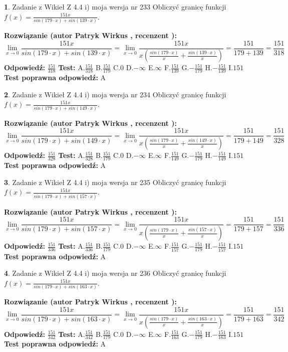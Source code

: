\documentclass[12pt, a4paper]{article}
\theoremstyle{definition} %
\newtheorem{zad}{}
\newcommand{\zadStart}[1]{\begin{zad}#1\newline}
\newcommand{\zadStop}{\end{zad}}
\newcommand{\rozwStart}[2]{\noindent \textbf{Rozwiązanie (autor #1 , recenzent #2): }\newline}
\newcommand{\rozwStop}{\newline}
\newcommand{\odpStart}{\noindent \textbf{Odpowiedź:}\newline}
\newcommand{\odpStop}{\newline}
\newcommand{\testStart}{\noindent \textbf{Test:}\newline}
\newcommand{\testStop}{\newline}
\newcommand{\kluczStart}{\noindent \textbf{Test poprawna odpowiedź:}\newline}
\newcommand{\kluczStop}{\newline}
\begin{document}
\zadStart{Zadanie z Wikieł Z 4.4 i) moja wersja nr 233}
Obliczyć granicę funkcji $f(x)=\frac{151x}{sin(179\cdot x) +sin(139\cdot x)}$.
\zadStop
\rozwStart{Patryk Wirkus}{}
$$\lim\limits_{x\to 0}\frac{151x}{sin(179\cdot x) +sin(139\cdot x)}=\lim\limits_{x\to 0}\frac{151x}{x(\frac{sin(179\cdot x)}{x}+\frac{sin(139\cdot x)}{x})}=\frac{151}{179+139} = \frac{151}{318}$$
\rozwStop
\odpStart
$\frac{151}{318}$
\odpStop
\testStart
A.$\frac{151}{318}$
B.$\frac{151}{179}$
C.$0$
D.$-\infty$
E.$\infty$
F.$\frac{151}{139}$
G.$-\frac{151}{179}$
H.$-\frac{151}{139}$
I.$151$
\testStop
\kluczStart
A
\kluczStop



\zadStart{Zadanie z Wikieł Z 4.4 i) moja wersja nr 234}
Obliczyć granicę funkcji $f(x)=\frac{151x}{sin(179\cdot x) +sin(149\cdot x)}$.
\zadStop
\rozwStart{Patryk Wirkus}{}
$$\lim\limits_{x\to 0}\frac{151x}{sin(179\cdot x) +sin(149\cdot x)}=\lim\limits_{x\to 0}\frac{151x}{x(\frac{sin(179\cdot x)}{x}+\frac{sin(149\cdot x)}{x})}=\frac{151}{179+149} = \frac{151}{328}$$
\rozwStop
\odpStart
$\frac{151}{328}$
\odpStop
\testStart
A.$\frac{151}{328}$
B.$\frac{151}{179}$
C.$0$
D.$-\infty$
E.$\infty$
F.$\frac{151}{149}$
G.$-\frac{151}{179}$
H.$-\frac{151}{149}$
I.$151$
\testStop
\kluczStart
A
\kluczStop



\zadStart{Zadanie z Wikieł Z 4.4 i) moja wersja nr 235}
Obliczyć granicę funkcji $f(x)=\frac{151x}{sin(179\cdot x) +sin(157\cdot x)}$.
\zadStop
\rozwStart{Patryk Wirkus}{}
$$\lim\limits_{x\to 0}\frac{151x}{sin(179\cdot x) +sin(157\cdot x)}=\lim\limits_{x\to 0}\frac{151x}{x(\frac{sin(179\cdot x)}{x}+\frac{sin(157\cdot x)}{x})}=\frac{151}{179+157} = \frac{151}{336}$$
\rozwStop
\odpStart
$\frac{151}{336}$
\odpStop
\testStart
A.$\frac{151}{336}$
B.$\frac{151}{179}$
C.$0$
D.$-\infty$
E.$\infty$
F.$\frac{151}{157}$
G.$-\frac{151}{179}$
H.$-\frac{151}{157}$
I.$151$
\testStop
\kluczStart
A
\kluczStop



\zadStart{Zadanie z Wikieł Z 4.4 i) moja wersja nr 236}
Obliczyć granicę funkcji $f(x)=\frac{151x}{sin(179\cdot x) +sin(163\cdot x)}$.
\zadStop
\rozwStart{Patryk Wirkus}{}
$$\lim\limits_{x\to 0}\frac{151x}{sin(179\cdot x) +sin(163\cdot x)}=\lim\limits_{x\to 0}\frac{151x}{x(\frac{sin(179\cdot x)}{x}+\frac{sin(163\cdot x)}{x})}=\frac{151}{179+163} = \frac{151}{342}$$
\rozwStop
\odpStart
$\frac{151}{342}$
\odpStop
\testStart
A.$\frac{151}{342}$
B.$\frac{151}{179}$
C.$0$
D.$-\infty$
E.$\infty$
F.$\frac{151}{163}$
G.$-\frac{151}{179}$
H.$-\frac{151}{163}$
I.$151$
\testStop
\kluczStart
A
\kluczStop
\end{document}
